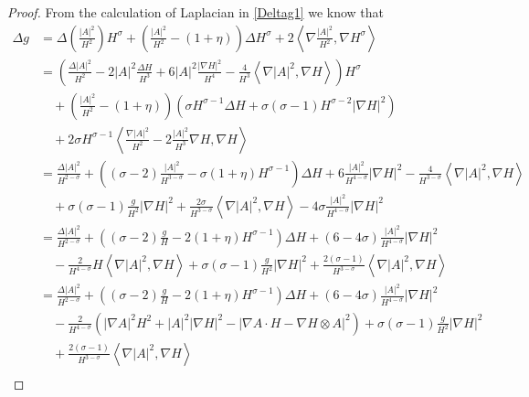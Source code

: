 \begin{proof}
    From the calculation of Laplacian in \cref{Deltag1} we know that \begin{align*}
        \Delta g & = \Delta  \left(\frac{|A|^{2}}{H^{2}} \right)H^{\sigma} + \left( \frac{|A|^{2}}{H^{2}} - (1+\eta) \right)\Delta H^{\sigma} + 2\left<  \nabla  \frac{|A|^{2}}{H^{2}} , \nabla H^{\sigma} \right> \\
        & = \left( \frac{\Delta |A|^{2}}{{H^{2}}} - 2|A|^{2} \frac{\Delta H}{H^{3}} + 6|A|^{2} \frac{| \nabla H|^{2}}{H^{4}} - \frac{4}{H^{3}}\left< \nabla |A|^{2}, \nabla H \right> \right)H^{\sigma} \\
        & \quad + \left( \frac{|A|^{2}}{H^{2}} - (1+\eta) \right)\left( \sigma H^{\sigma-1}\Delta H + \sigma (\sigma -1)H^{\sigma -2}|\nabla H|^{2} \right) \\
        & \quad + 2\sigma H^{\sigma-1}\left< \frac{\nabla|A|^{2}}{H^{2}} -2 \frac{|A|^{2}}{H^{3}} \nabla H , \nabla H\right> \\
        & =  \frac{\Delta |A|^{2}}{H^{2-\sigma}} + \left( (\sigma-2) \frac{|A|^{2}}{H^{3-\sigma}} - \sigma(1+\eta)H^{\sigma-1} \right)\Delta H + 6 \frac{|A|^{2}}{H^{4-\sigma}}|\nabla H|^{2} - \frac{4}{H^{3-\sigma}}\left< \nabla |A|^{2}, \nabla H \right>  \\
        & \quad + \sigma(\sigma -1)\frac{g}{H^{2}}|\nabla H|^{2} + \frac{2 \sigma}{H^{3-\sigma}} \left< \nabla |A|^{2}, \nabla H \right> - 4\sigma \frac{|A|^{2}}{H^{4-\sigma}}|\nabla H|^{2} \\
        & =  \frac{\Delta |A|^{2}}{H^{2-\sigma}} + \left( (\sigma-2)\frac{g}{H} - 2(1+\eta)H^{\sigma-1} \right)\Delta H + \left( 6-4 \sigma \right)\frac{|A|^{2}}{H^{4-\sigma}}|\nabla H|^{2}  \\
        & \quad - \frac{2}{H^{4-\sigma}}H\left< \nabla |A|^{2}, \nabla H \right> + \sigma(\sigma -1)\frac{g}{H^{2}}|\nabla H|^{2} + \frac{2(\sigma -1)}{H^{3-\sigma}} \left< \nabla |A|^{2}, \nabla H \right> \\
        & = \frac{\Delta |A|^{2}}{H^{2-\sigma}} + \left( (\sigma-2)\frac{g}{H} - 2(1+\eta)H^{\sigma-1} \right)\Delta H + \left( 6-4 \sigma \right)\frac{|A|^{2}}{H^{4-\sigma}}|\nabla H|^{2}  \\
        & \quad - \frac{2}{H^{4-\sigma}}\left( |\nabla A|^{2}H^{2} + |A|^{2}|\nabla H|^{2}-|\nabla A \cdot H - \nabla H \otimes A|^{2} \right) + \sigma(\sigma -1)\frac{g}{H^{2}}|\nabla H|^{2} \\
        & \quad + \frac{2(\sigma -1)}{H^{3-\sigma}} \left< \nabla |A|^{2}, \nabla H \right>  \\

\end{align*}
\end{proof}
